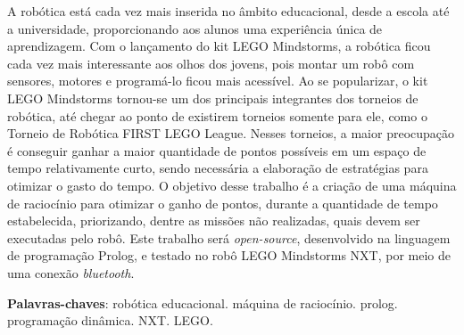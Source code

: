 \begin{resumo}
A robótica está cada vez mais inserida no âmbito educacional, desde a escola até a universidade, proporcionando aos alunos uma experiência única de aprendizagem. Com o lançamento do kit LEGO Mindstorms, a robótica ficou cada vez mais interessante aos olhos dos jovens, pois montar um robô com sensores, motores e programá-lo ficou mais acessível. Ao se popularizar, o kit LEGO Mindstorms tornou-se um dos principais integrantes dos torneios de robótica, até chegar ao ponto de existirem torneios somente para ele, como o Torneio de Robótica FIRST LEGO League. Nesses torneios, a maior preocupação é conseguir ganhar a maior quantidade de pontos possíveis em um espaço de tempo relativamente curto, sendo necessária a elaboração de estratégias para otimizar o gasto do tempo. O objetivo desse trabalho é a criação de uma máquina de raciocínio para otimizar o ganho de pontos, durante a quantidade de tempo estabelecida, priorizando, dentre as missões não realizadas, quais devem ser executadas pelo robô. Este trabalho será \textit{open-source}, desenvolvido na linguagem de programação Prolog, e testado no robô LEGO Mindstorms NXT, por meio de uma conexão \textit{bluetooth}.

\vspace{\onelineskip}
    
 \noindent
 \textbf{Palavras-chaves}: robótica educacional. máquina de raciocínio. prolog. programação dinâmica. NXT. LEGO. 
\end{resumo}
